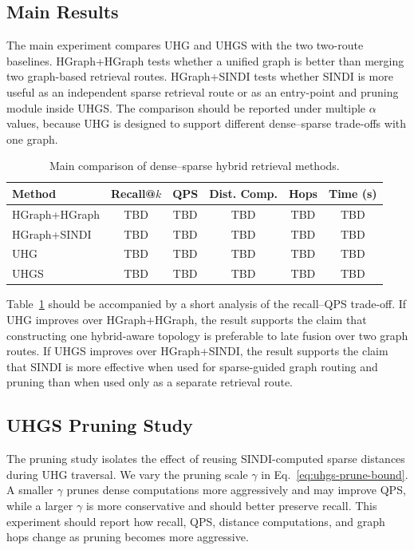 \subsection{Main Results}

The main experiment compares UHG and UHGS with the two two-route baselines. HGraph+HGraph tests whether a unified graph is better than merging two graph-based retrieval routes. HGraph+SINDI tests whether SINDI is more useful as an independent sparse retrieval route or as an entry-point and pruning module inside UHGS. The comparison should be reported under multiple $\alpha$ values, because UHG is designed to support different dense--sparse trade-offs with one graph.

\begin{table}[t]
\centering
\caption{Main comparison of dense--sparse hybrid retrieval methods.}
\label{tab:main-results}
\begin{tabular}{lccccc}
\hline
Method & Recall@$k$ & QPS & Dist. Comp. & Hops & Time (s) \\
\hline
HGraph+HGraph & TBD & TBD & TBD & TBD & TBD \\
HGraph+SINDI & TBD & TBD & TBD & TBD & TBD \\
UHG & TBD & TBD & TBD & TBD & TBD \\
UHGS & TBD & TBD & TBD & TBD & TBD \\
\hline
\end{tabular}
\end{table}

Table~\ref{tab:main-results} should be accompanied by a short analysis of the recall--QPS trade-off. If UHG improves over HGraph+HGraph, the result supports the claim that constructing one hybrid-aware topology is preferable to late fusion over two graph routes. If UHGS improves over HGraph+SINDI, the result supports the claim that SINDI is more effective when used for sparse-guided graph routing and pruning than when used only as a separate retrieval route.

\subsection{UHGS Pruning Study}

The pruning study isolates the effect of reusing SINDI-computed sparse distances during UHG traversal. We vary the pruning scale $\gamma$ in Eq.~\eqref{eq:uhgs-prune-bound}. A smaller $\gamma$ prunes dense computations more aggressively and may improve QPS, while a larger $\gamma$ is more conservative and should better preserve recall. This experiment should report how recall, QPS, distance computations, and graph hops change as pruning becomes more aggressive.

